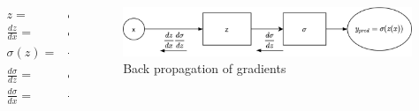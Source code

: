 \begin{frame}{}
	\begin{columns}
		\begin{column}{.5\textwidth}
			\begin{align}
				z=&ax+b \\
				\frac{dz}{dx} =& a \\
				\sigma(z) =&\frac{1}{e^{-z}+1} \\
				\frac{d\sigma}{dz} =& \sigma(z)(1-\sigma(z)) \\
				\frac{d\sigma}{dx}=&\frac{d\sigma}{dz} \frac{dz}{dx}=\frac{dz}{dx} \frac{d\sigma}{dz}  
			\end{align}
		\end{column}
		\begin{column}{.5\textwidth}
			\begin{figure}
				\includegraphics[width=.8\textwidth, center]{figures/function_composition_sigma}
				\caption*{Back propagation of gradients}
			\end{figure}
		\end{column}
	\end{columns}
\end{frame}